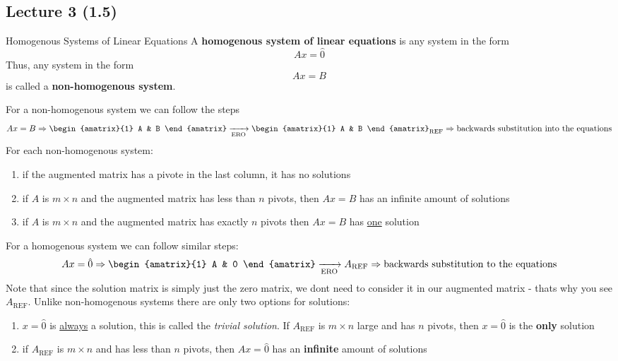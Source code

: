\subsection{Lecture 3 (1.5)}

\begin{defbox}{Homogenous Systems of Linear Equations}{}
    A \textbf{homogenous system of linear equations} is any system in the form 
    \[Ax = \hat{0}\]
    Thus, any system in the form \[Ax = B\] is called a \textbf{non-homogenous system}. 
\end{defbox}

For a non-homogenous system we can follow the steps
\[ Ax = B \Rightarrow \begin{amatrix}{1} A & B \end{amatrix} \xrightarrow[\text{ERO}]{} \begin{amatrix}{1} A & B \end{amatrix}_{\text{REF}} \Rightarrow \text{backwards substitution into the equations}\]
For each non-homogenous system:
\begin{enumerate}
    \item if the augmented matrix has a pivote in the last column, it has no solutions
    \item if $A$ is $m \times n$ and the augmented matrix has less than $n$ pivots, then $Ax=B$ has an infinite amount of solutions
    \item if $A$ is $m \times n$ and the augmented matrix has exactly $n$ pivots then $Ax=B$ has \underline{one} solution
\end{enumerate}
For a homogenous system we can follow similar steps:
\[Ax = \hat{0} \Rightarrow \begin{amatrix}{1} A & 0 \end{amatrix}\xrightarrow[\text{ERO}]{} A_{\text{REF}} \Rightarrow \text{backwards substitution to the equations}\]
Note that since the solution matrix is simply just the zero matrix, we dont need to consider it in our augmented matrix - thats why you see $A_\text{REF}$. Unlike non-homogenous systems there are only two options for solutions:
\begin{enumerate}
    \item $x=\hat{0}$ is \underline{always} a solution, this is called the \textit{trivial solution}. If $A_\text{REF}$ is $m \times n$ large and has $n$ pivots, then $x=\hat{0}$ is the \textbf{only} solution
    \item if $A_{\text{REF}}$ is $m \times n$ and has less than $n$ pivots, then $Ax=\hat{0}$ has an \textbf{infinite} amount of solutions
\end{enumerate}


